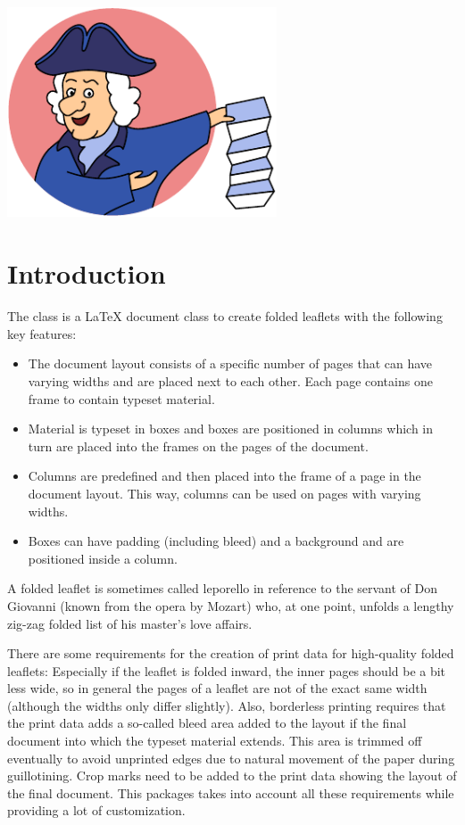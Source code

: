 \documentclass[a4paper]{article}
\begin{document}
\vspace*{-2.5em}
\noindent\hspace{-10pt}
\includegraphics[width=80mm]{doc/leporello.pdf}
\bigskip

\printdoctitle
\bigskip

\section{Introduction}

The  class is a LaTeX document class to create folded leaflets with the following key features:

\begin{itemize}
  \item The document layout consists of a specific number of pages that can have varying widths and are placed next to each other. Each page contains one frame to contain typeset material.
  \item Material is typeset in boxes and boxes are positioned in columns which in turn are placed into the frames on the pages of the document.
  \item Columns are predefined and then placed into the frame of a page in the document layout. This way, columns can be used on pages with varying widths.
  \item Boxes can have padding (including bleed) and a background and are positioned inside a column.
\end{itemize}

A folded leaflet is sometimes called leporello in reference to the servant of Don Giovanni (known from the opera by Mozart) who, at one point, unfolds a lengthy zig-zag folded list of his master's love affairs.

There are some requirements for the creation of print data for high-quality folded leaflets: Especially if the leaflet is folded inward, the inner pages should be a bit less wide, so in general the pages of a leaflet are not of the exact same width (although the widths only differ slightly). Also, borderless printing requires that the print data adds a so-called bleed area added to the layout if the final document into which the typeset material extends. This area is trimmed off eventually to avoid unprinted edges due to natural movement of the paper during guillotining. Crop marks need to be added to the print data showing the layout of the final document. This packages takes into account all these requirements while providing a lot of customization.
\end{document}
